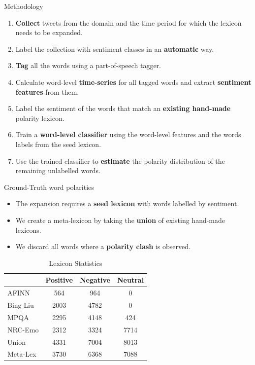 \documentclass[handout]{beamer}
\begin{document}
\begin{frame}{Methodology}
\begin{scriptsize}
\begin{enumerate}
\item \textbf{Collect} tweets from the domain and the time period for which the lexicon needs to be expanded. 
\item Label the collection with sentiment classes in an \textbf{automatic} way.
\item \textbf{Tag} all the words using a part-of-speech tagger.
\item Calculate word-level \textbf{time-series} for all tagged words and extract \textbf{sentiment features} from them.
\item Label the sentiment of the words that match an \textbf{existing hand-made} polarity lexicon.
\item Train a \textbf{word-level classifier} using the word-level features and the words labels from the seed lexicon.
\item Use the trained classifier to \textbf{estimate} the polarity distribution of the remaining unlabelled words.
\end{enumerate}
\end{scriptsize}
\end{frame}


\begin{frame}{Ground-Truth word polarities}
\begin{scriptsize}
\begin{itemize}
\item The expansion requires a \textbf{seed lexicon} with words labelled by sentiment.
\item We create a meta-lexicon by taking the \textbf{union} of existing hand-made lexicons.
\item We discard all words where a \textbf{polarity clash} is observed.
\end{itemize}


\begin{table}[htbp]
\begin{center}
\begin{tabular}{l|c|c|c}
\hline
 & Positive & Negative & Neutral \\ \hline
AFINN & 564 & 964 & 0 \\ 
Bing Liu & 2003 & 4782 & 0 \\ 
MPQA & 2295 & 4148 & 424 \\ 
NRC-Emo & 2312 & 3324 & 7714 \\ \hline
Union & 4331 & 7004 & 8013 \\ 
Meta-Lex & 3730 & 6368 & 7088 \\ \hline
\end{tabular}
\end{center}
\caption{Lexicon Statistics}
\label{tab:lexstats}
\end{table}
\end{scriptsize}
\end{frame}
\end{document}
